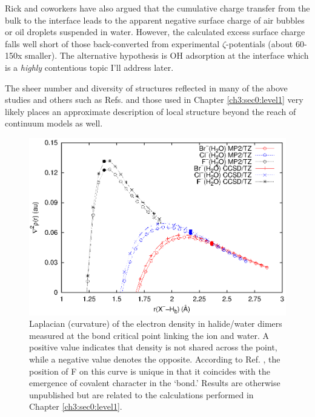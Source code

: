 \begin{intro}
   Rick and coworkers have also argued that the cumulative charge transfer from the bulk to the interface leads
   to the apparent negative surface charge of air bubbles or oil droplets suspended in water\cite{vacha2011oil,soniat2014ct_surf,takahashi2005zeta}. However, the calculated excess 
   surface charge falls well short of those back-converted from experimental $\zeta$-potentials (about 60-150x smaller). The alternative hypothesis is OH\sur{-} adsorption at the 
   interface which is a \emph{highly} contentious topic I'll address later.
   
   The sheer number and diversity of structures reflected in many of the above studies and others such as Refs. \cite{ivanov2014stabilization,kemp2005theoretical,lambrecht2011exploring,lambrecht2012refined} 
   and those used in Chapter \ref{ch3:sec0:level1} very likely places an approximate description of local structure beyond the reach of continuum models as well.
   
\begin{figure}
 \begin{center}
  \includegraphics[width=0.98\linewidth]{images/laprho_v_distH.eps}
 \end{center}
\caption[Electron density curvature in halide/water dimers versus separation]{Laplacian (curvature) of the electron density in halide/water dimers measured at the bond critical point
linking the ion and water. A positive value indicates that density is not shared across the point, while a negative value denotes the opposite. According to Ref. \cite{espinosa}, the 
position of F\sur{-} on this curve is unique in that it coincides with the emergence of covalent character in the `bond.' Results are otherwise unpublished but are related to the 
calculations performed in Chapter \ref{ch3:sec0:level1}.}
\label{fig:laprho}
\end{figure}   
  

\end{intro}

